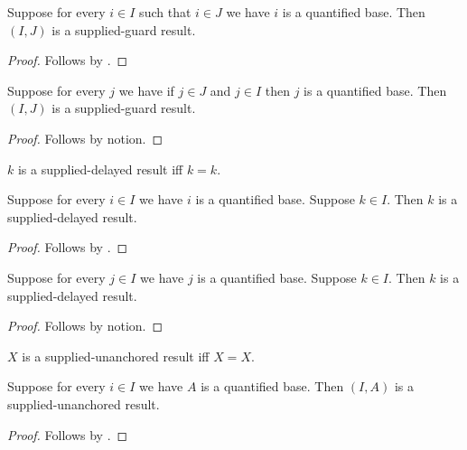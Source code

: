 \begin{classification}\label{supplied_guard_classification}
    Suppose for every $i\in I$ such that $i\in J$ we have $i$ is a quantified base.
    Then $(I,J)$ is a supplied-guard result.
\end{classification}
\begin{proof}
    Follows by .
\end{proof}

\begin{theorem}\label{supplied_guard_regrouping}
    Suppose for every $j$ we have if $j\in J$ and $j\in I$ then $j$ is a quantified base.
    Then $(I,J)$ is a supplied-guard result.
\end{theorem}
\begin{proof}
    Follows by notion.
\end{proof}

\begin{definition}\label{supplied_delayed_result}
    $k$ is a supplied-delayed result iff $k=k$.
\end{definition}

\begin{classification}\label{supplied_delayed_classification}
    Suppose for every $i\in I$ we have $i$ is a quantified base.
    Suppose $k\in I$.
    Then $k$ is a supplied-delayed result.
\end{classification}
\begin{proof}
    Follows by .
\end{proof}

\begin{theorem}\label{supplied_delayed_membership}
    Suppose for every $j\in I$ we have $j$ is a quantified base.
    Suppose $k\in I$.
    Then $k$ is a supplied-delayed result.
\end{theorem}
\begin{proof}
    Follows by notion.
\end{proof}

\begin{definition}\label{supplied_unanchored_result}
    $X$ is a supplied-unanchored result iff $X=X$.
\end{definition}

\begin{classification}\label{supplied_unanchored_classification}
    Suppose for every $i\in I$ we have $A$ is a quantified base.
    Then $(I,A)$ is a supplied-unanchored result.
\end{classification}
\begin{proof}
    Follows by .
\end{proof}

